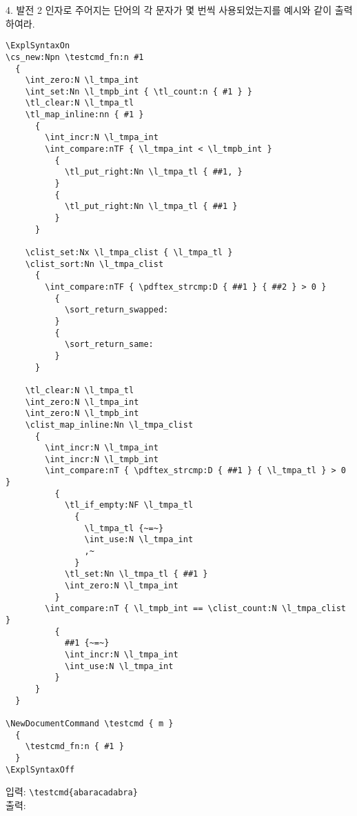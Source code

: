\documentclass[a4paper,amsmath,itemph]{oblivoir}
\begin{document}
\begin{questionp}{4. 발전 2}
  인자로 주어지는 단어의 각 문자가 몇 번씩 사용되었는지를 예시와 같이
  출력하여라.

  \tcblower

  \begin{verbatim}
\ExplSyntaxOn
\cs_new:Npn \testcmd_fn:n #1
  {
    \int_zero:N \l_tmpa_int
    \int_set:Nn \l_tmpb_int { \tl_count:n { #1 } }
    \tl_clear:N \l_tmpa_tl
    \tl_map_inline:nn { #1 }
      {
        \int_incr:N \l_tmpa_int
        \int_compare:nTF { \l_tmpa_int < \l_tmpb_int }
          {
            \tl_put_right:Nn \l_tmpa_tl { ##1, }
          }
          {
            \tl_put_right:Nn \l_tmpa_tl { ##1 }
          }
      }

    \clist_set:Nx \l_tmpa_clist { \l_tmpa_tl }
    \clist_sort:Nn \l_tmpa_clist
      {
        \int_compare:nTF { \pdftex_strcmp:D { ##1 } { ##2 } > 0 }
          {
            \sort_return_swapped:
          }
          {
            \sort_return_same:
          }
      }

    \tl_clear:N \l_tmpa_tl
    \int_zero:N \l_tmpa_int
    \int_zero:N \l_tmpb_int
    \clist_map_inline:Nn \l_tmpa_clist
      {
        \int_incr:N \l_tmpa_int
        \int_incr:N \l_tmpb_int
        \int_compare:nT { \pdftex_strcmp:D { ##1 } { \l_tmpa_tl } > 0 }
          {
            \tl_if_empty:NF \l_tmpa_tl
              {
                \l_tmpa_tl {~=~}
                \int_use:N \l_tmpa_int
                ,~
              }
            \tl_set:Nn \l_tmpa_tl { ##1 }
            \int_zero:N \l_tmpa_int
          }
        \int_compare:nT { \l_tmpb_int == \clist_count:N \l_tmpa_clist }
          {
            ##1 {~=~}
            \int_incr:N \l_tmpa_int
            \int_use:N \l_tmpa_int
          }
      }
  }

\NewDocumentCommand \testcmd { m }
  {
    \testcmd_fn:n { #1 }
  }
\ExplSyntaxOff
  \end{verbatim}

  \begin{tcolorbox}{}
    입력: \verb|\testcmd{abaracadabra}|\\
    출력: 
  \end{tcolorbox}
\end{questionp}
\end{document}
